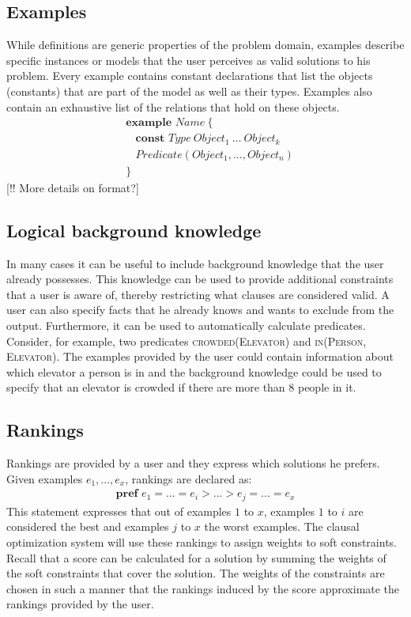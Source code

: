 \subsection{Examples}
While definitions are generic properties of the problem domain, examples describe specific instances or models that the user perceives as valid solutions to his problem. Every example contains constant declarations that list the objects (constants) that are part of the model as well as their types. Examples also contain an exhaustive list of the relations that hold on these objects.
\begin{align*}
&\textbf{example } Name\  \{\\
&\  \  \  \  \textbf{const } Type\  Object_1\  ...\  Object_k\\
&\  \  \  \  Predicate(Object_1, ..., Object_n)\\
&\}
\end{align*}
[!! More details on format?]

\subsection{Logical background knowledge}
In many cases it can be useful to include background knowledge that the user already possesses. This knowledge can be used to provide additional constraints that a user is aware of, thereby restricting what clauses are considered valid. A user can also specify facts that he already knows and wants to exclude from the output. Furthermore, it can be used to automatically calculate predicates. Consider, for example, two predicates \textsc{crowded(Elevator)} and \textsc{in(Person, Elevator)}. The examples provided by the user could contain information about which elevator a person is in and the background knowledge could be used to specify that an elevator is crowded if there are more than 8 people in it.

\subsection{Rankings}
Rankings are provided by a user and they express which solutions he prefers. Given examples $e_1, ..., e_x$, rankings are declared as:
\begin{align*}
\textbf{pref } e_1 = ... = e_i > ... > e_j = ... = e_x
\end{align*}
This statement expresses that out of examples $1$ to $x$, examples $1$ to $i$ are considered the best and examples $j$ to $x$ the worst examples. The clausal optimization system will use these rankings to assign weights to soft constraints. Recall that a score can be calculated for a solution by summing the weights of the soft constraints that cover the solution. The weights of the constraints are chosen in such a manner that the rankings induced by the score approximate the rankings provided by the user. 

